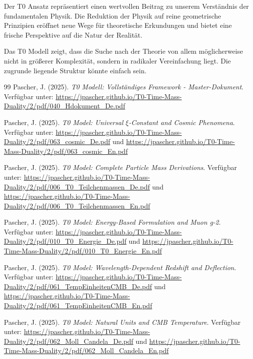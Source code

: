 	Der T0 Ansatz repräsentiert einen wertvollen Beitrag zu unserem Verständnis der fundamentalen Physik. Die Reduktion der Physik auf reine geometrische Prinzipien eröffnet neue Wege für theoretische Erkundungen und bietet eine frische Perspektive auf die Natur der Realität.
	
	\begin{revolutionaer}
		Das T0 Modell zeigt, dass die Suche nach der Theorie von allem möglicherweise nicht in größerer Komplexität, sondern in radikaler Vereinfachung liegt. Die zugrunde liegende Struktur könnte einfach sein.
	\end{revolutionaer}
	
	\begin{thebibliography}{99}
		Pascher, J. (2025). \textit{T0 Modell: Vollständiges Framework - Master-Dokument}. Verfügbar unter: \url{https://jpascher.github.io/T0-Time-Mass-Duality/2/pdf/040_Hdokument_De.pdf}
		
		Pascher, J. (2025). \textit{T0 Model: Universal $\xi$-Constant and Cosmic Phenomena}. Verfügbar unter: \url{https://jpascher.github.io/T0-Time-Mass-Duality/2/pdf/063_cosmic_De.pdf} und \url{https://jpascher.github.io/T0-Time-Mass-Duality/2/pdf/063_cosmic_En.pdf}
		
		Pascher, J. (2025). \textit{T0 Model: Complete Particle Mass Derivations}. Verfügbar unter: \url{https://jpascher.github.io/T0-Time-Mass-Duality/2/pdf/006_T0_Teilchenmassen_De.pdf} und \url{https://jpascher.github.io/T0-Time-Mass-Duality/2/pdf/006_T0_Teilchenmassen_En.pdf}
		
		Pascher, J. (2025). \textit{T0 Model: Energy-Based Formulation and Muon g-2}. Verfügbar unter: \url{https://jpascher.github.io/T0-Time-Mass-Duality/2/pdf/010_T0_Energie_De.pdf} und \url{https://jpascher.github.io/T0-Time-Mass-Duality/2/pdf/010_T0_Energie_En.pdf}
		
		Pascher, J. (2025). \textit{T0 Model: Wavelength-Dependent Redshift and Deflection}. Verfügbar unter: \url{https://jpascher.github.io/T0-Time-Mass-Duality/2/pdf/061_TempEinheitenCMB_De.pdf} und \url{https://jpascher.github.io/T0-Time-Mass-Duality/2/pdf/061_TempEinheitenCMB_En.pdf}
		
		Pascher, J. (2025). \textit{T0 Model: Natural Units and CMB Temperature}. Verfügbar unter: \url{https://jpascher.github.io/T0-Time-Mass-Duality/2/pdf/062_Moll_Candela_De.pdf} und \url{https://jpascher.github.io/T0-Time-Mass-Duality/2/pdf/062_Moll_Candela_En.pdf}
		

\end{thebibliography}

